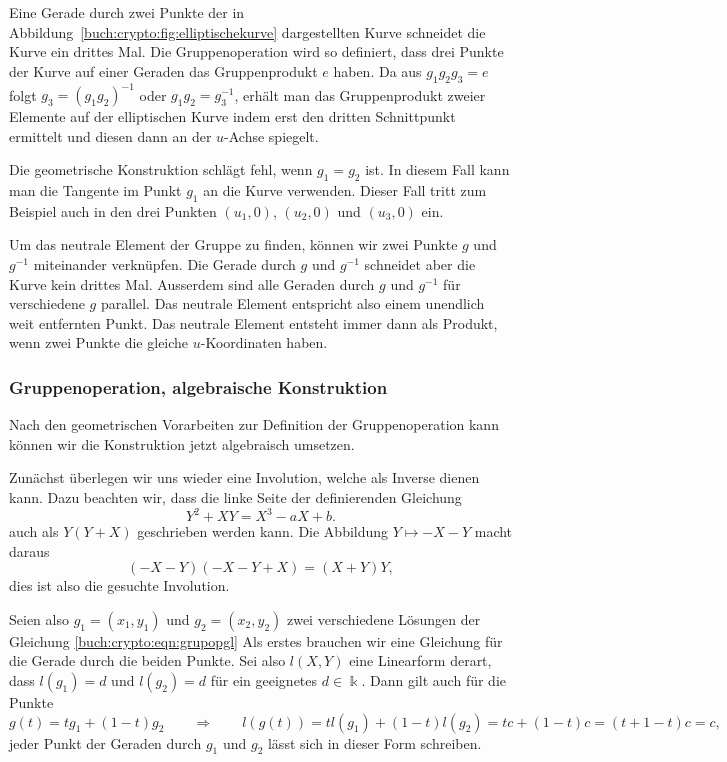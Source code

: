 Eine Gerade durch zwei Punkte der
in Abbildung~\ref{buch:crypto:fig:elliptischekurve}
dargestellten Kurve schneidet die Kurve ein drittes Mal.
Die Gruppenoperation wird so definiert, dass drei Punkte der Kurve
auf einer Geraden das Gruppenprodukt $e$ haben.
Da aus $g_1g_2g_3=e$ folgt $g_3=(g_1g_2)^{-1}$ oder
$g_1g_2=g_3^{-1}$, erhält man das Gruppenprodukt zweier Elemente
auf der elliptischen Kurve indem erst den dritten Schnittpunkt
ermittelt und diesen dann an der $u$-Achse spiegelt.

Die geometrische Konstruktion schlägt fehl, wenn $g_1=g_2$ ist.
In diesem Fall kann man die Tangente im Punkt $g_1$ an die Kurve 
verwenden.
Dieser Fall tritt zum Beispiel auch in den drei Punkten 
$(u_1,0)$, $(u_2,0)$ und $(u_3,0)$ ein.

Um das neutrale Element der Gruppe zu finden, können wir 
zwei Punkte $g$ und $g^{-1}$ miteinander verknüpfen.
Die Gerade durch $g$ und $g^{-1}$ schneidet aber die Kurve
kein drittes Mal.
Ausserdem sind alle Geraden durch $g$ und $g^{-1}$ für verschiedene
$g$ parallel.
Das neutrale Element entspricht also einem unendlich weit entfernten Punkt.
Das neutrale Element entsteht immer dann als Produkt, wenn zwei
Punkte die gleiche $u$-Koordinaten haben.

\subsubsection{Gruppenoperation, algebraische Konstruktion}
Nach den geometrischen Vorarbeiten zur Definition der Gruppenoperation
kann können wir die Konstruktion jetzt algebraisch umsetzen.

Zunächst überlegen wir uns wieder eine Involution, welche als Inverse
dienen kann.
Dazu beachten wir, dass die linke Seite der definierenden Gleichung
\begin{equation}
Y^2+XY=X^3-aX+b.
\label{buch:crypto:eqn:grupopgl}
\end{equation}
auch als $Y(Y+X)$ geschrieben werden kann.
Die Abbildung $Y\mapsto -X-Y$ macht daraus
\[
(-X-Y)(-X-Y+X)=(X+Y)Y,
\]
dies ist also die gesuchte Involution.

Seien also $g_1=(x_1,y_1)$ und $g_2=(x_2,y_2)$ zwei verschiedene Lösungen
der Gleichung \eqref{buch:crypto:eqn:grupopgl}
Als erstes brauchen wir eine Gleichung für die Gerade durch die beiden
Punkte.
Sei also $l(X,Y)$ eine Linearform derart, dass $l(g_1)=d$ und $l(g_2)=d$
für ein geeignetes $d\in\Bbbk$.
Dann gilt auch für die Punkte
\[
g(t) = tg_1 + (1-t)g_2
\qquad\Rightarrow\qquad
l(g(t))
=
tl(g_1) + (1-t)l(g_2)
=
tc+(1-t)c
=
(t+1-t)c
=c,
\]
jeder Punkt der Geraden durch $g_1$ und $g_2$ lässt sich in dieser Form
schreiben.

